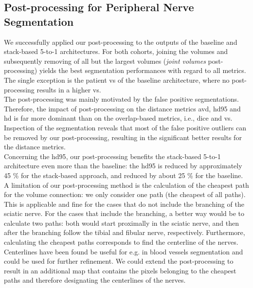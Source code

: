 \subsection{Post-processing for Peripheral Nerve Segmentation}
We successfully applied our post-processing to the outputs of the baseline and stack-based 5-to-1 architectures. For both cohorts, joining the volumes and subsequently removing of all but the largest volumes (\textit{joint volumes} post-processing) yields the best segmentation performances with regard to all metrics. The single exception is the patient \acrlong{vs} of the baseline architecture, where no post-processing results in a higher \gls{vs}.\\
The post-processing was mainly motivated by the false positive segmentations. Therefore, the impact of post-processing on the distance metrics \gls{avd}, \gls{hd95} and \gls{hd} is far more dominant than on the overlap-based metrics, i.e., \gls{dice} and \gls{vs}. Inspection of the segmentation reveals that most of the false positive outliers can be removed by our post-processing, resulting in the significant better results for the distance metrics.\\
Concerning the \acrlong{hd95}, our post-processing benefits the stack-based 5-to-1 architecture even more than the baseline: the \gls{hd95} is reduced by approximately 45 \% for the stack-based approach, and reduced by about 25 \% for the baseline.\\
A limitation of our post-processing method is the calculation of the cheapest path for the volume connection: we only consider one path (the cheapest of all paths). This is applicable and fine for the cases that do not include the branching of the sciatic nerve. For the cases that include the branching, a better way would be to calculate two paths: both would start proximally in the sciatic nerve, and then after the branching follow the tibial and fibular nerve, respectively.
Furthermore, calculating the cheapest paths corresponds to find the centerline of the nerves. Centerlines have been found be useful for e.g. in blood vessels segmentation and could be used for further refinement. We could extend the post-processing to result in an additional map that contains the pixels belonging to the cheapest paths and therefore designating the centerlines of the nerves.

